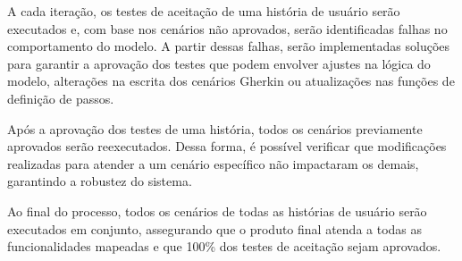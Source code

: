 A cada iteração, os testes de aceitação de uma história de usuário serão executados e, com base nos cenários não aprovados, serão identificadas falhas no comportamento 
do modelo. A partir dessas falhas, serão implementadas soluções para garantir a aprovação dos testes que podem envolver ajustes na lógica do modelo, 
alterações na escrita dos cenários Gherkin ou atualizações nas funções de definição de passos.

Após a aprovação dos testes de uma história, todos os cenários previamente aprovados serão reexecutados. Dessa forma, é possível verificar que modificações realizadas 
para atender a um cenário específico não impactaram os demais, garantindo a robustez do sistema.

Ao final do processo, todos os cenários de todas as histórias de usuário serão executados em conjunto, assegurando que o produto final atenda a todas as funcionalidades 
mapeadas e que 100\% dos testes de aceitação sejam aprovados.




